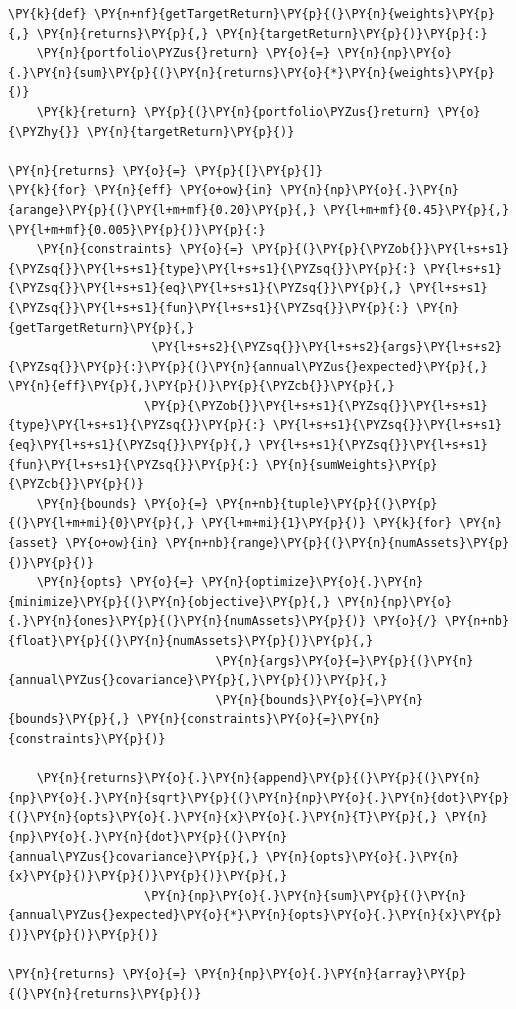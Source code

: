 \begin{tcolorbox}[breakable, size=fbox, boxrule=1pt, pad at break*=1mm,colback=cellbackground, colframe=cellborder]
\begin{Verbatim}[commandchars=\\\{\}]
\PY{k}{def} \PY{n+nf}{getTargetReturn}\PY{p}{(}\PY{n}{weights}\PY{p}{,} \PY{n}{returns}\PY{p}{,} \PY{n}{targetReturn}\PY{p}{)}\PY{p}{:}
    \PY{n}{portfolio\PYZus{}return} \PY{o}{=} \PY{n}{np}\PY{o}{.}\PY{n}{sum}\PY{p}{(}\PY{n}{returns}\PY{o}{*}\PY{n}{weights}\PY{p}{)}
    \PY{k}{return} \PY{p}{(}\PY{n}{portfolio\PYZus{}return} \PY{o}{\PYZhy{}} \PY{n}{targetReturn}\PY{p}{)}

\PY{n}{returns} \PY{o}{=} \PY{p}{[}\PY{p}{]}
\PY{k}{for} \PY{n}{eff} \PY{o+ow}{in} \PY{n}{np}\PY{o}{.}\PY{n}{arange}\PY{p}{(}\PY{l+m+mf}{0.20}\PY{p}{,} \PY{l+m+mf}{0.45}\PY{p}{,} \PY{l+m+mf}{0.005}\PY{p}{)}\PY{p}{:}
    \PY{n}{constraints} \PY{o}{=} \PY{p}{(}\PY{p}{\PYZob{}}\PY{l+s+s1}{\PYZsq{}}\PY{l+s+s1}{type}\PY{l+s+s1}{\PYZsq{}}\PY{p}{:} \PY{l+s+s1}{\PYZsq{}}\PY{l+s+s1}{eq}\PY{l+s+s1}{\PYZsq{}}\PY{p}{,} \PY{l+s+s1}{\PYZsq{}}\PY{l+s+s1}{fun}\PY{l+s+s1}{\PYZsq{}}\PY{p}{:} \PY{n}{getTargetReturn}\PY{p}{,}
                    \PY{l+s+s2}{\PYZsq{}}\PY{l+s+s2}{args}\PY{l+s+s2}{\PYZsq{}}\PY{p}{:}\PY{p}{(}\PY{n}{annual\PYZus{}expected}\PY{p}{,} \PY{n}{eff}\PY{p}{,}\PY{p}{)}\PY{p}{\PYZcb{}}\PY{p}{,}
                   \PY{p}{\PYZob{}}\PY{l+s+s1}{\PYZsq{}}\PY{l+s+s1}{type}\PY{l+s+s1}{\PYZsq{}}\PY{p}{:} \PY{l+s+s1}{\PYZsq{}}\PY{l+s+s1}{eq}\PY{l+s+s1}{\PYZsq{}}\PY{p}{,} \PY{l+s+s1}{\PYZsq{}}\PY{l+s+s1}{fun}\PY{l+s+s1}{\PYZsq{}}\PY{p}{:} \PY{n}{sumWeights}\PY{p}{\PYZcb{}}\PY{p}{)}
    \PY{n}{bounds} \PY{o}{=} \PY{n+nb}{tuple}\PY{p}{(}\PY{p}{(}\PY{l+m+mi}{0}\PY{p}{,} \PY{l+m+mi}{1}\PY{p}{)} \PY{k}{for} \PY{n}{asset} \PY{o+ow}{in} \PY{n+nb}{range}\PY{p}{(}\PY{n}{numAssets}\PY{p}{)}\PY{p}{)}
    \PY{n}{opts} \PY{o}{=} \PY{n}{optimize}\PY{o}{.}\PY{n}{minimize}\PY{p}{(}\PY{n}{objective}\PY{p}{,} \PY{n}{np}\PY{o}{.}\PY{n}{ones}\PY{p}{(}\PY{n}{numAssets}\PY{p}{)} \PY{o}{/} \PY{n+nb}{float}\PY{p}{(}\PY{n}{numAssets}\PY{p}{)}\PY{p}{,} 
                             \PY{n}{args}\PY{o}{=}\PY{p}{(}\PY{n}{annual\PYZus{}covariance}\PY{p}{,}\PY{p}{)}\PY{p}{,}
                             \PY{n}{bounds}\PY{o}{=}\PY{n}{bounds}\PY{p}{,} \PY{n}{constraints}\PY{o}{=}\PY{n}{constraints}\PY{p}{)}

    \PY{n}{returns}\PY{o}{.}\PY{n}{append}\PY{p}{(}\PY{p}{(}\PY{n}{np}\PY{o}{.}\PY{n}{sqrt}\PY{p}{(}\PY{n}{np}\PY{o}{.}\PY{n}{dot}\PY{p}{(}\PY{n}{opts}\PY{o}{.}\PY{n}{x}\PY{o}{.}\PY{n}{T}\PY{p}{,} \PY{n}{np}\PY{o}{.}\PY{n}{dot}\PY{p}{(}\PY{n}{annual\PYZus{}covariance}\PY{p}{,} \PY{n}{opts}\PY{o}{.}\PY{n}{x}\PY{p}{)}\PY{p}{)}\PY{p}{)}\PY{p}{,}
                   \PY{n}{np}\PY{o}{.}\PY{n}{sum}\PY{p}{(}\PY{n}{annual\PYZus{}expected}\PY{o}{*}\PY{n}{opts}\PY{o}{.}\PY{n}{x}\PY{p}{)}\PY{p}{)}\PY{p}{)}

\PY{n}{returns} \PY{o}{=} \PY{n}{np}\PY{o}{.}\PY{n}{array}\PY{p}{(}\PY{n}{returns}\PY{p}{)}
\end{Verbatim}
\end{tcolorbox}

